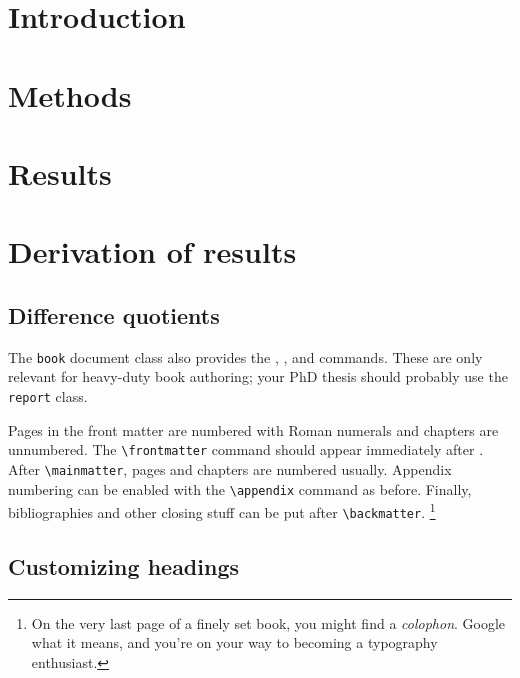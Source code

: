 \begin{ExampleCode}
\section{Introduction} %
\section{Methods} %
\section{Results} %

\appendix

\section{Derivation of results} %
\subsection{Difference quotients} %
\end{ExampleCode}

The \verb|book| document class also provides the
, , and  commands.
These are only relevant for heavy-duty book authoring;
your PhD thesis should probably use the \verb|report| class.

Pages in the front matter are numbered with Roman numerals
and chapters are unnumbered.
The \verb|\frontmatter| command should appear immediately after \verb||.
After \verb|\mainmatter|, pages and chapters are numbered usually.
Appendix numbering can be enabled with the \verb|\appendix| command as before.
Finally, bibliographies and other closing stuff can be put after \verb|\backmatter|.%
\footnote{On the very last page of a finely set book, you might find a \emph{colophon}.
Google what it means, and you're on your way to becoming a typography enthusiast.}

\subsection{Customizing headings}


